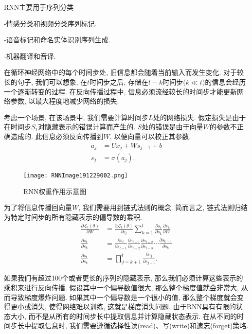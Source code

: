 RNN主要用于序列分类

-情感分类和视频分类序列标记.

-语音标记和命名实体识别序列生成.

-机器翻译和音译.

在循环神经网络中的每个时间步处, 旧信息都会随着当前输入而发生变化. 对于较长的句子, 我们可以想象, 在$t$时间步之后, 存储在$t-k$时间步($k\ll t)$的信息会经历一个逐渐转变的过程.
在反向传播过程中, 信息必须流经较长的时间步才能更新网络参数, 以最大程度地减少网络的损失.

考虑一个场景, 在该场景中, 我们需要计算时间步$L$处的网络损失. 假定损失是由于在时间步$S_1$对隐藏表示的错误计算而产生的. $S$处的错误是由于向量$W$的参数不正确造成的. 此信息必须反向传播到$W$, 以便向量可以校正其参数.
\begin{align}
    a_{j}&=U x_{j}+W s_{j-1}+b\\
    s_{j}&=\sigma\left(a_{j}\right).
\end{align}
\begin{figure}[H]
\centering
\texttt{[image: RNNImage191229002.png]}
\caption{RNN权重作用示意图}
\label{RNNImage191229002}\vspace{-0.4cm}
\end{figure}

为了将信息传播回向量$W$, 我们需要用到链式法则的概念. 简而言之, 链式法则归结为特定时间步的所有隐藏表示的偏导数的乘积.
\begin{align}
    \frac{\partial \mathscr{L}_{t}(\theta)}{\partial W}&=\frac{\partial \mathscr{L}_{t}(\theta)}{\partial s_{t}} \sum_{k=1}^{t} \frac{\partial s_{t}}{\partial s_{k}} \frac{\partial s_{k}}{\partial W}\\
    \frac{\partial s_{t}}{\partial s_{k}}               &=\frac{\partial s_{t}}{\partial s_{t-1}} \frac{\partial s_{t-1}}{\partial s_{t-2}} \frac{\partial s_{t-2}}{\partial s_{t-3}} \cdots \frac{\partial s_{k+1}}{\partial s_{k}}\\
    \frac{\partial s_{t}}{\partial s_{k}}               &=\prod_{j=k+1}^{t} \frac{\partial s_{j}}{\partial s_{j-1}}.
\end{align}

如果我们有超过100个或者更长的序列的隐藏表示, 那么我们必须计算这些表示的乘积来进行反向传播. 假设其中一个偏导数值很大, 那么整个梯度值就会非常大, 从而导致梯度爆炸问题.
如果其中一个偏导数是一个很小的值, 那么整个梯度就会变得更小或消失, 使得网络难以训练, 这就是梯度消失问题.
由于RNN具有有限的状态大小, 而不是从所有的时间步长中提取信息并计算隐藏状态表示. 在从不同的时间步长中提取信息时, 我们需要遵循选择性读(read)、写(write)和遗忘(forget)策略.

